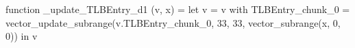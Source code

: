 function _update_TLBEntry_d1 (v, x) = let v = { v with TLBEntry_chunk_0 = vector_update_subrange(v.TLBEntry_chunk_0, 33, 33, vector_subrange(x, 0, 0)) } in v
